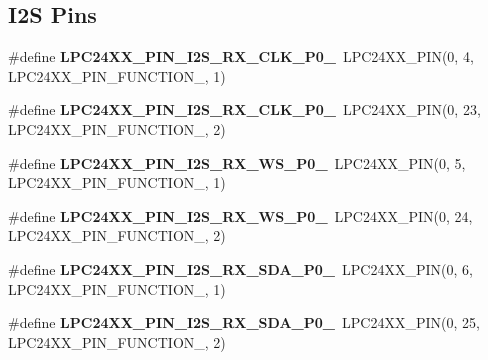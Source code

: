 \subsection*{I2S Pins}
\begin{DoxyCompactItemize}
\item 
\mbox{\label{group__lpc24xx__io_gab9d9e429fc04657de2d2b74a8187d25d}} 
\#define {\bfseries L\+P\+C24\+X\+X\+\_\+\+P\+I\+N\+\_\+\+I2\+S\+\_\+\+R\+X\+\_\+\+C\+L\+K\+\_\+\+P0\+\_}~L\+P\+C24\+X\+X\+\_\+\+P\+IN(0, 4, L\+P\+C24\+X\+X\+\_\+\+P\+I\+N\+\_\+\+F\+U\+N\+C\+T\+I\+O\+N\+\_, 1)
\item 
\mbox{\label{group__lpc24xx__io_ga160017b320cae2237c8f49f31db59217}} 
\#define {\bfseries L\+P\+C24\+X\+X\+\_\+\+P\+I\+N\+\_\+\+I2\+S\+\_\+\+R\+X\+\_\+\+C\+L\+K\+\_\+\+P0\+\_}~L\+P\+C24\+X\+X\+\_\+\+P\+IN(0, 23, L\+P\+C24\+X\+X\+\_\+\+P\+I\+N\+\_\+\+F\+U\+N\+C\+T\+I\+O\+N\+\_, 2)
\item 
\mbox{\label{group__lpc24xx__io_ga625823f3d4a92803277353d5180a3b91}} 
\#define {\bfseries L\+P\+C24\+X\+X\+\_\+\+P\+I\+N\+\_\+\+I2\+S\+\_\+\+R\+X\+\_\+\+W\+S\+\_\+\+P0\+\_}~L\+P\+C24\+X\+X\+\_\+\+P\+IN(0, 5, L\+P\+C24\+X\+X\+\_\+\+P\+I\+N\+\_\+\+F\+U\+N\+C\+T\+I\+O\+N\+\_, 1)
\item 
\mbox{\label{group__lpc24xx__io_gad4f188969b232a17e4c6ddfcb497bc02}} 
\#define {\bfseries L\+P\+C24\+X\+X\+\_\+\+P\+I\+N\+\_\+\+I2\+S\+\_\+\+R\+X\+\_\+\+W\+S\+\_\+\+P0\+\_}~L\+P\+C24\+X\+X\+\_\+\+P\+IN(0, 24, L\+P\+C24\+X\+X\+\_\+\+P\+I\+N\+\_\+\+F\+U\+N\+C\+T\+I\+O\+N\+\_, 2)
\item 
\mbox{\label{group__lpc24xx__io_ga30b59d91fea53de7fa18852a67c832ae}} 
\#define {\bfseries L\+P\+C24\+X\+X\+\_\+\+P\+I\+N\+\_\+\+I2\+S\+\_\+\+R\+X\+\_\+\+S\+D\+A\+\_\+\+P0\+\_}~L\+P\+C24\+X\+X\+\_\+\+P\+IN(0, 6, L\+P\+C24\+X\+X\+\_\+\+P\+I\+N\+\_\+\+F\+U\+N\+C\+T\+I\+O\+N\+\_, 1)
\item 
\mbox{\label{group__lpc24xx__io_ga92c1f8ebf40fe9719bf49a1acbef4aca}} 
\#define {\bfseries L\+P\+C24\+X\+X\+\_\+\+P\+I\+N\+\_\+\+I2\+S\+\_\+\+R\+X\+\_\+\+S\+D\+A\+\_\+\+P0\+\_}~L\+P\+C24\+X\+X\+\_\+\+P\+IN(0, 25, L\+P\+C24\+X\+X\+\_\+\+P\+I\+N\+\_\+\+F\+U\+N\+C\+T\+I\+O\+N\+\_, 2)

\end{DoxyCompactItemize}
